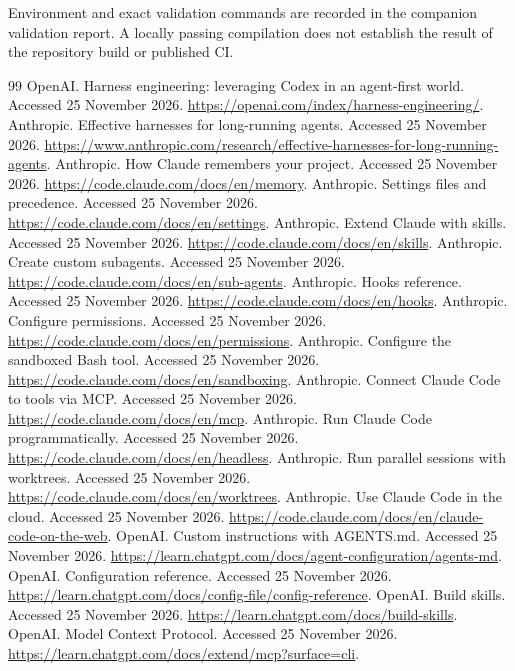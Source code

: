 \documentclass[11pt,letterpaper]{article}
\begin{document}
Environment and exact validation commands are recorded in the companion validation report. A locally passing compilation does not establish the result of the repository build or published CI.
\clearpage\begin{thebibliography}{99}
 OpenAI. Harness engineering: leveraging Codex in an agent-first world. Accessed 25 November 2026. \url{https://openai.com/index/harness-engineering/}.
 Anthropic. Effective harnesses for long-running agents. Accessed 25 November 2026. \url{https://www.anthropic.com/research/effective-harnesses-for-long-running-agents}.
 Anthropic. How Claude remembers your project. Accessed 25 November 2026. \url{https://code.claude.com/docs/en/memory}.
 Anthropic. Settings files and precedence. Accessed 25 November 2026. \url{https://code.claude.com/docs/en/settings}.
 Anthropic. Extend Claude with skills. Accessed 25 November 2026. \url{https://code.claude.com/docs/en/skills}.
 Anthropic. Create custom subagents. Accessed 25 November 2026. \url{https://code.claude.com/docs/en/sub-agents}.
 Anthropic. Hooks reference. Accessed 25 November 2026. \url{https://code.claude.com/docs/en/hooks}.
 Anthropic. Configure permissions. Accessed 25 November 2026. \url{https://code.claude.com/docs/en/permissions}.
 Anthropic. Configure the sandboxed Bash tool. Accessed 25 November 2026. \url{https://code.claude.com/docs/en/sandboxing}.
 Anthropic. Connect Claude Code to tools via MCP. Accessed 25 November 2026. \url{https://code.claude.com/docs/en/mcp}.
 Anthropic. Run Claude Code programmatically. Accessed 25 November 2026. \url{https://code.claude.com/docs/en/headless}.
 Anthropic. Run parallel sessions with worktrees. Accessed 25 November 2026. \url{https://code.claude.com/docs/en/worktrees}.
 Anthropic. Use Claude Code in the cloud. Accessed 25 November 2026. \url{https://code.claude.com/docs/en/claude-code-on-the-web}.
 OpenAI. Custom instructions with AGENTS.md. Accessed 25 November 2026. \url{https://learn.chatgpt.com/docs/agent-configuration/agents-md}.
 OpenAI. Configuration reference. Accessed 25 November 2026. \url{https://learn.chatgpt.com/docs/config-file/config-reference}.
 OpenAI. Build skills. Accessed 25 November 2026. \url{https://learn.chatgpt.com/docs/build-skills}.
 OpenAI. Model Context Protocol. Accessed 25 November 2026. \url{https://learn.chatgpt.com/docs/extend/mcp?surface=cli}.

\end{thebibliography}
\end{document}
